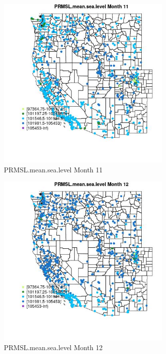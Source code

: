 \begin{figure} 
\centering  
\includegraphics[width=0.77\textwidth]{Code_Outputs/Report_ML_input_PM25_Step4_part_e_de_duplicated_aves_compiled_2019-05-21wNAs_MapObsMo11PRMSLmeansealevel.jpg} 
\caption{\label{fig:Report_ML_input_PM25_Step4_part_e_de_duplicated_aves_compiled_2019-05-21wNAsMapObsMo11PRMSLmeansealevel}PRMSL.mean.sea.level Month 11} 
\end{figure} 
 

\begin{figure} 
\centering  
\includegraphics[width=0.77\textwidth]{Code_Outputs/Report_ML_input_PM25_Step4_part_e_de_duplicated_aves_compiled_2019-05-21wNAs_MapObsMo12PRMSLmeansealevel.jpg} 
\caption{\label{fig:Report_ML_input_PM25_Step4_part_e_de_duplicated_aves_compiled_2019-05-21wNAsMapObsMo12PRMSLmeansealevel}PRMSL.mean.sea.level Month 12} 
\end{figure} 
 

